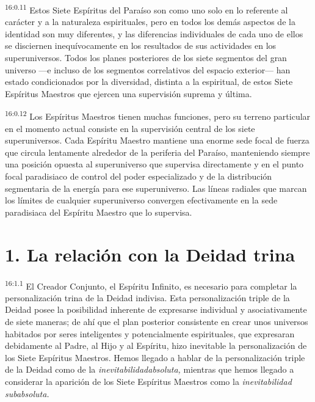\par
\textsuperscript{16:0.11} Estos Siete Espíritus del Paraíso son como uno solo en lo referente al carácter y a la naturaleza espirituales, pero en todos los demás aspectos de la identidad son muy diferentes, y las diferencias individuales de cada uno de ellos se disciernen inequívocamente en los resultados de sus actividades en los superuniversos. Todos los planes posteriores de los siete segmentos del gran universo ---e incluso de los segmentos correlativos del espacio exterior--- han estado condicionados por la diversidad, distinta a la espiritual, de estos Siete Espíritus Maestros que ejercen una supervisión suprema y última.

\par
\textsuperscript{16:0.12} Los Espíritus Maestros tienen muchas funciones, pero su terreno particular en el momento actual consiste en la supervisión central de los siete superuniversos. Cada Espíritu Maestro mantiene una enorme sede focal de fuerza que circula lentamente alrededor de la periferia del Paraíso, manteniendo siempre una posición opuesta al superuniverso que supervisa directamente y en el punto focal paradisiaco de control del poder especializado y de la distribución segmentaria de la energía para ese superuniverso. Las líneas radiales que marcan los límites de cualquier superuniverso convergen efectivamente en la sede paradisiaca del Espíritu Maestro que lo supervisa.

\section*{1. La relación con la Deidad trina}
\par
\textsuperscript{16:1.1} El Creador Conjunto, el Espíritu Infinito, es necesario para completar la personalización trina de la Deidad indivisa. Esta personalización triple de la Deidad posee la posibilidad inherente de expresarse individual y asociativamente de siete maneras; de ahí que el plan posterior consistente en crear unos universos habitados por seres inteligentes y potencialmente espirituales, que expresaran debidamente al Padre, al Hijo y al Espíritu, hizo inevitable la personalización de los Siete Espíritus Maestros. Hemos llegado a hablar de la personalización triple de la Deidad como de la \textit{inevitabilidadabsoluta,} mientras que hemos llegado a considerar la aparición de los Siete Espíritus Maestros como la \textit{inevitabilidad subabsoluta.}

